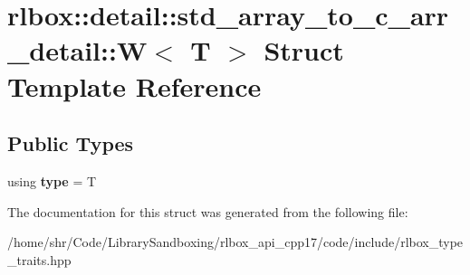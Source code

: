 \hypertarget{structrlbox_1_1detail_1_1std__array__to__c__arr__detail_1_1W}{}\section{rlbox\+:\+:detail\+:\+:std\+\_\+array\+\_\+to\+\_\+c\+\_\+arr\+\_\+detail\+:\+:W$<$ T $>$ Struct Template Reference}
\label{structrlbox_1_1detail_1_1std__array__to__c__arr__detail_1_1W}
\subsection*{Public Types}
\begin{DoxyCompactItemize}
\item 
\mbox{\label{structrlbox_1_1detail_1_1std__array__to__c__arr__detail_1_1W_a0820ff0c6b9407092672b903661c9459}} 
using {\bfseries type} = T
\end{DoxyCompactItemize}


The documentation for this struct was generated from the following file\+:\begin{DoxyCompactItemize}
\item 
/home/shr/\+Code/\+Library\+Sandboxing/rlbox\+\_\+api\+\_\+cpp17/code/include/rlbox\+\_\+type\+\_\+traits.\+hpp\end{DoxyCompactItemize}
